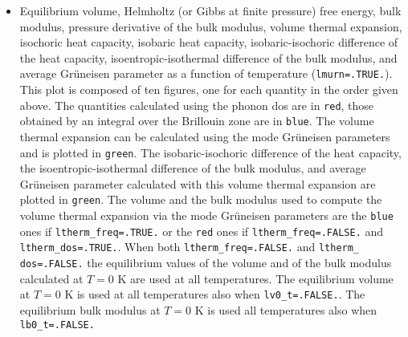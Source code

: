 \documentclass[12pt,a4paper,twoside]{report}
\begin{document}
\begin{itemize}
\item
Equilibrium volume, Helmholtz (or Gibbs at finite pressure) free energy, 
bulk modulus, pressure derivative of the bulk
modulus, volume thermal expansion, isochoric heat capacity, 
isobaric heat capacity, isobaric-isochoric difference of the heat capacity,    
isoentropic-isothermal difference of the bulk modulus, and 
average Gr\"uneisen parameter as a function of temperature 
(\texttt{lmurn=.TRUE.}). 
This plot is composed of ten figures, one for each 
quantity in the order given above. The quantities 
calculated using the phonon dos are in \texttt{red}, those
obtained by an integral over the Brillouin zone are in \texttt{blue}.
The volume thermal expansion can be calculated using the mode Gr\"uneisen 
parameters and is plotted in \texttt{green}. 
The isobaric-isochoric difference of the heat capacity, the
isoentropic-isothermal difference of the bulk modulus, and
average Gr\"uneisen parameter calculated with this volume thermal expansion 
are plotted in \texttt{green}. The volume and the bulk modulus used to
compute the volume thermal expansion via the mode Gr\"uneisen parameters
are the \texttt{blue} ones if \texttt{ltherm\_freq=.TRUE.}
or the \texttt{red} ones if \texttt{ltherm\_freq=.FALSE.} and 
\texttt{ltherm\_dos=.TRUE.}.
When both \texttt{ltherm\_freq=.FALSE.} and \texttt{ltherm\_}
\texttt{dos=.FALSE.}
the equilibrium values of the volume and of the bulk modulus calculated 
at $T=0$ K are used at all temperatures.
The equilibrium volume at $T=0$ K is used at all temperatures also when
\texttt{lv0\_t=.FALSE.}.
The equilibrium bulk modulus at $T=0$ K is used all temperatures also
when \texttt{lb0\_t=.FALSE.}


\end{itemize}
\end{document}
